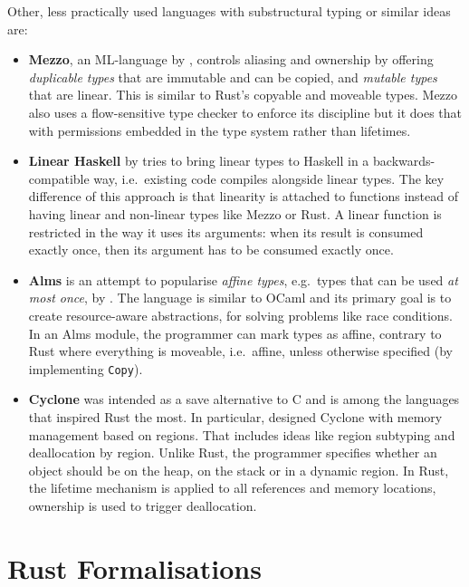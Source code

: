 Other, less practically used languages with substructural typing or
similar ideas are:

\begin{itemize}
\item \textbf{Mezzo}, an ML-language by \citet{mezzo}, controls aliasing and
ownership by offering \emph{duplicable types} that are immutable and can be
copied, and \emph{mutable types} that are linear. This is similar to Rust's
copyable and moveable types. Mezzo also uses a flow-sensitive type checker to
enforce its discipline but it does that with permissions embedded in the type
system rather than lifetimes.

\item \textbf{Linear Haskell} by \citet{linear-haskell} tries to bring linear
types to Haskell in a backwards-compatible way, i.e.~existing code compiles
alongside linear types. The key difference of this approach is that linearity is
attached to functions instead of having linear and non-linear types like Mezzo
or Rust. A linear function is restricted in the way it uses its arguments: when
its result is consumed exactly once, then its argument has to be consumed
exactly once.

\item \textbf{Alms} is an attempt to popularise \emph{affine types}, e.g.~types
that can be used \emph{at most once}, by \citet{alms}. The language is similar
to OCaml and its primary goal is to create resource-aware abstractions, for
solving problems like race conditions. In an Alms module, the programmer can
mark types as affine, contrary to Rust where everything is moveable,
i.e.~affine, unless otherwise specified (by implementing \lstinline!Copy!).

\item \textbf{Cyclone} was intended as a save alternative to C and is among the
languages that inspired Rust the most. In particular, \citet{cyclone-region}
designed Cyclone with memory management based on regions. That includes ideas
like region subtyping and deallocation by region. Unlike Rust, the programmer
specifies whether an object should be on the heap, on the stack or in a dynamic
region. In Rust, the lifetime mechanism is applied to all references and memory
locations, ownership is used to trigger deallocation.
\end{itemize}


\section{Rust Formalisations}

